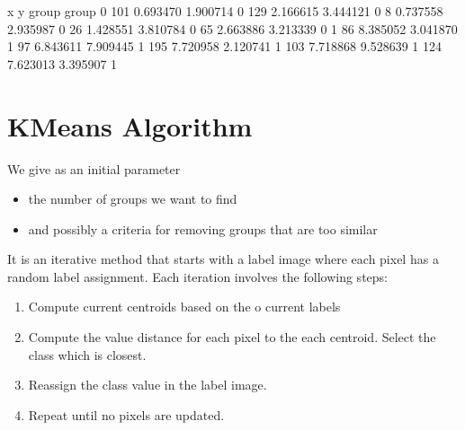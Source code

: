 \documentclass[letterpaper,10pt,english]{sphinxmanual}
\begin{document}
\begin{sphinxVerbatim}[commandchars=\\\{\}]
                  x         y  group
group                               
0     101 \PYGZhy{}0.693470  1.900714      0
      129 \PYGZhy{}2.166615  3.444121      0
      8   \PYGZhy{}0.737558  2.935987      0
      26  \PYGZhy{}1.428551  3.810784      0
      65  \PYGZhy{}2.663886  3.213339      0
1     86   8.385052 \PYGZhy{}3.041870      1
      97   6.843611 \PYGZhy{}7.909445      1
      195  7.720958 \PYGZhy{}2.120741      1
      103  7.718868 \PYGZhy{}9.528639      1
      124  7.623013 \PYGZhy{}3.395907      1
\end{sphinxVerbatim}

\noindent{}


\section{K\sphinxhyphen{}Means Algorithm}
\label{\detokenize{05-AdvancedSegmentation:k-means-algorithm}}
\sphinxAtStartPar
We give as an initial parameter
\begin{itemize}
\item {} 
\sphinxAtStartPar
the number of groups we want to find

\item {} 
\sphinxAtStartPar
and possibly a criteria for removing groups that are too similar

\end{itemize}



\sphinxAtStartPar
It is an iterative method that starts with a label image where each pixel has a random label assignment. Each iteration involves the following steps:
\begin{enumerate}
%
\item {} 
\sphinxAtStartPar
Compute current centroids based on the o current labels

\item {} 
\sphinxAtStartPar
Compute the value distance for each pixel to the each centroid. Select the class which is closest.

\item {} 
\sphinxAtStartPar
Reassign the class value in the label image.

\item {} 
\sphinxAtStartPar
Repeat until no pixels are updated.

\end{enumerate}
\end{document}
